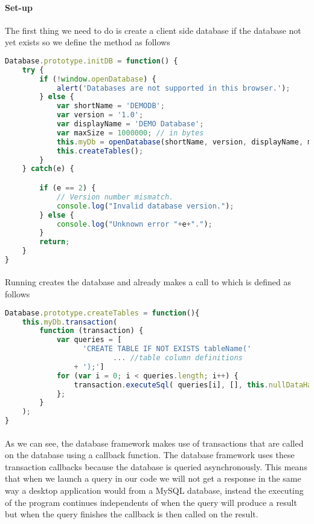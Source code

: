 	\paragraph{Set-up}
	The first thing we need to do is create a client side database if the database not yet exists so we define the  method as follows
	\begin{lstlisting}[language=JavaScript]
Database.prototype.initDB = function() {
	try {
		if (!window.openDatabase) {
			alert('Databases are not supported in this browser.');
		} else {
			var shortName = 'DEMODB';
			var version = '1.0';
			var displayName = 'DEMO Database';
			var maxSize = 1000000; // in bytes
			this.myDb = openDatabase(shortName, version, displayName, maxSize); //creation of DB
			this.createTables();
		}
	} catch(e) {

		if (e == 2) {
			// Version number mismatch.
			console.log("Invalid database version.");
		} else {
			console.log("Unknown error "+e+".");
		}
		return;
	}
}
	\end{lstlisting}
	\paragraph{}
	Running  creates the database and already makes a call to  which is defined as follows
	\begin{lstlisting}[language=JavaScript]
Database.prototype.createTables = function(){
	this.myDb.transaction(
		function (transaction) {
			var queries = [
				  'CREATE TABLE IF NOT EXISTS tableName('
						 ... //table column definitions
				+ ');']
			for (var i = 0; i < queries.length; i++) {
				transaction.executeSql( queries[i], [], this.nullDataHandler, this.errorHandler);
			};
		}
	);
}
	\end{lstlisting}
	\paragraph{}
	As we can see, the database framework makes use of transactions that are called on the database using a callback function. The database framework uses these transaction callbacks because the database is queried asynchronously. This means that when we launch a query in our code we will not get a response in the same way a desktop application would from a MySQL\cite{dubois2008mysql} database, instead the executing of the program continues independents of when the query will produce a result but when the query finishes the callback is then called on the result. 
